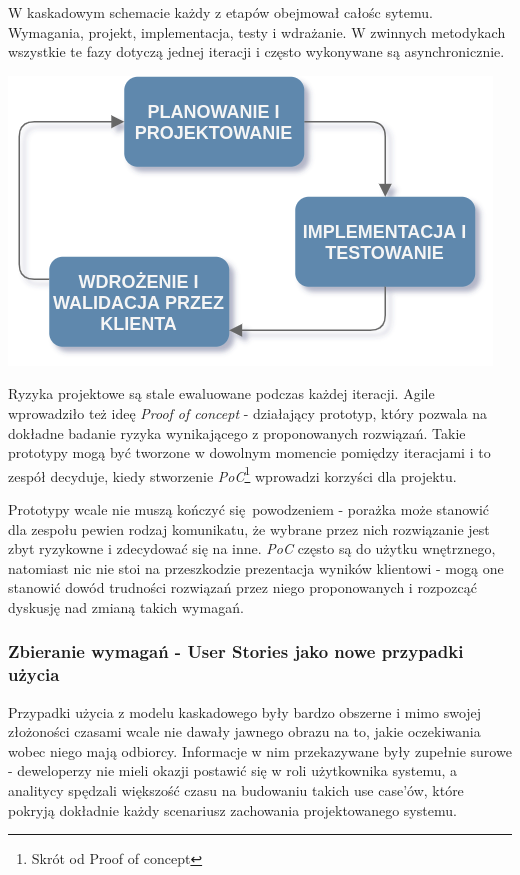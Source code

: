 \documentclass{article}
\begin{document}
W kaskadowym schemacie każdy z etapów obejmował całośc sytemu. Wymagania, projekt, implementacja, testy i wdrażanie. W zwinnych metodykach wszystkie te fazy dotyczą jednej iteracji i często wykonywane są asynchronicznie.

\begin{center}
    \includegraphics[scale=0.35]{agile.png}
\end{center}

Ryzyka projektowe są stale ewaluowane podczas każdej iteracji. Agile wprowadziło też ideę \textit{Proof of concept} - działający prototyp, który pozwala na dokładne badanie ryzyka wynikającego z proponowanych rozwiązań. Takie prototypy mogą być tworzone w dowolnym momencie pomiędzy iteracjami i to zespół decyduje, kiedy stworzenie \textit{PoC}\footnote{Skrót od Proof of concept} wprowadzi korzyści dla projektu.

Prototypy wcale nie muszą kończyć się powodzeniem - porażka może stanowić dla zespołu pewien rodzaj komunikatu, że wybrane przez nich rozwiązanie jest zbyt ryzykowne i zdecydować się na inne. \textit{PoC} często są do użytku wnętrznego, natomiast nic nie stoi na przeszkodzie prezentacja wyników klientowi - mogą one stanowić dowód trudności rozwiązań przez niego proponowanych i rozpozcąć dyskusję nad zmianą takich wymagań.

\subsubsection*{Zbieranie wymagań - User Stories jako nowe przypadki użycia}
Przypadki użycia z modelu kaskadowego były bardzo obszerne i mimo swojej złożoności czasami wcale nie dawały jawnego obrazu na to, jakie oczekiwania wobec niego mają odbiorcy. Informacje w nim przekazywane były zupełnie surowe - deweloperzy nie mieli okazji postawić się w roli użytkownika systemu, a analitycy spędzali większość czasu na budowaniu takich use case'ów, które pokryją dokładnie każdy scenariusz zachowania projektowanego systemu.
\end{document}
